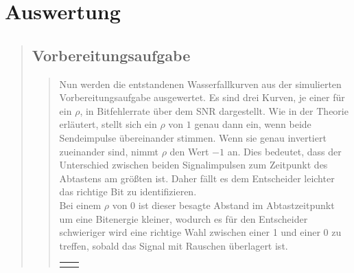 \section{Auswertung}
\begin{quote}
    
    \subsection{Vorbereitungsaufgabe}
    \begin{quote}
    
    Nun werden die entstandenen Wasserfallkurven aus der simulierten
    Vorbereitungsaufgabe ausgewertet. Es sind drei Kurven, je einer für ein
    $\rho$, in Bitfehlerrate über dem SNR dargestellt. Wie in der Theorie
    erläutert, stellt sich ein $\rho$ von $1$ genau dann ein, wenn beide
    Sendeimpulse übereinander stimmen. Wenn sie genau invertiert zueinander
    sind, nimmt $\rho$ den Wert $-1$ an. Dies bedeutet, dass der Unterschied
    zwischen beiden Signalimpulsen zum Zeitpunkt des Abtastens am größten ist.
    Daher fällt es dem Entscheider leichter das richtige Bit zu
    identifizieren.\\ 
    Bei einem $\rho$ von $0$ ist dieser besagte Abstand im Abtastzeitpunkt
    um eine Bitenergie kleiner, wodurch es für den Entscheider schwieriger wird
    eine richtige Wahl zwischen einer 1 und einer 0 zu treffen, sobald das
    Signal mit Rauschen überlagert ist. 
    
                \begin{center}
                \begin{tabular}{ll}
    
                \hspace{-12em}
                    \begin{minipage}{0.6\textwidth}
    

\end{minipage}
\end{tabular}
\end{center}
\end{quote}
\end{quote}
